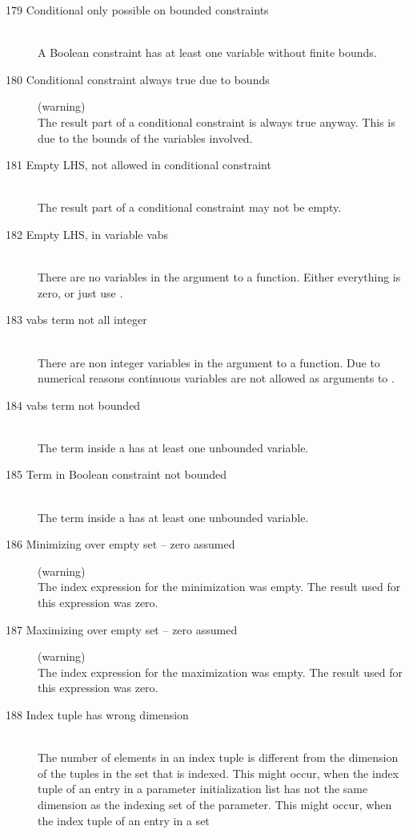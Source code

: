 \begin{description}
\item[179 Conditional only possible on bounded constraints]\ \\
   A Boolean constraint has at least one variable without finite bounds.
\item[180 Conditional constraint always true due to bounds] (warning)\ \\
   The result part of a conditional constraint is always true anyway. 
   This is due to the bounds of the variables involved.
\item[181 Empty LHS, not allowed in conditional constraint]\ \\
   The result part of a conditional constraint may not be empty.
\item[182 Empty LHS, in variable vabs]\ \\
   There are no variables in the argument to a  function.
   Either everything is zero, or just use .
\item[183 vabs term not all integer]\ \\
   There are non integer variables in the argument to a  function.
   Due to numerical reasons continuous variables are not allowed as
   arguments to . 
\item[184 vabs term not bounded]\ \\
   The term inside a  has at least one unbounded variable.
\item[185 Term in Boolean constraint not bounded]\ \\
   The term inside a  has at least one unbounded variable.
%
%
\item[186 Minimizing over empty set -- zero assumed] (warning)\ \\
   The index expression for the minimization was empty. The result
   used for this expression was zero.
\item[187 Maximizing over empty set -- zero assumed] (warning)\ \\
   The index expression for the maximization was empty. The result
   used for this expression was zero.
\item[188 Index tuple has wrong dimension]\ \\
   The number of elements in an index tuple is different from the
   dimension of the tuples in the set that is indexed.
   This might occur, when the index tuple of an entry in a parameter initialization list has
   not the same dimension as the indexing set of the parameter. 
   This might occur, when the index tuple of an entry in a set

\end{description}
